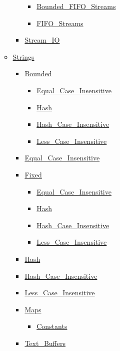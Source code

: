 \begin{multicols*}{\columnnr}
\begin{scriptsize}
\begin{itemize}[leftmargin=0mm]
\begin{itemize}[leftmargin=5mm]
\begin{itemize}[leftmargin=5mm]
\begin{itemize}[leftmargin=5mm]
	  \item[] \href{\adarmlink{RM-13-13-1.html}}{Bounded\_FIFO\_Streams}
	  \item[] \href{\adarmlink{RM-13-13-1.html}}{FIFO\_Streams}
	  \end{itemize}
	\item[] \href{\adarmlink{RM-A-12-1.html}}{Stream\_IO}
	\end{itemize}
  \item[] \href{\adarmlink{RM-A-4-1.html}}{Strings}
	\begin{itemize}[leftmargin=5mm]
	\item[] \href{\adarmlink{RM-A-4-4.html}}{Bounded}
	  \begin{itemize}[leftmargin=5mm]
	  \item[] \href{\adarmlink{RM-A-4-10.html}}{Equal\_Case\_Insensitive}
	  \item[] \href{\adarmlink{RM-A-4-9.html}}{Hash}
	  \item[] \href{\adarmlink{RM-A-4-9.html}}{Hash\_Case\_Insensitive}
	  \item[] \href{\adarmlink{RM-A-4-10.html}}{Less\_Case\_Insensitive}
	  \end{itemize}
	\item[] \href{\adarmlink{RM-A-4-10.html}}{Equal\_Case\_Insensitive}
	\item[] \href{\adarmlink{RM-A-4-3.html}}{Fixed}
	  \begin{itemize}[leftmargin=5mm]
	  \item[] \href{\adarmlink{RM-A-4-10.html}}{Equal\_Case\_Insensitive}
	  \item[] \href{\adarmlink{RM-A-4-9.html}}{Hash}
	  \item[] \href{\adarmlink{RM-A-4-9.html}}{Hash\_Case\_Insensitive}
	  \item[] \href{\adarmlink{RM-A-4-10.html}}{Less\_Case\_Insensitive}
	  \end{itemize}
	\item[] \href{\adarmlink{RM-A-4-9.html}}{Hash}
	\item[] \href{\adarmlink{RM-A-4-9.html}}{Hash\_Case\_Insensitive}
	\item[] \href{\adarmlink{RM-A-4-10.html}}{Less\_Case\_Insensitive}
	\item[] \href{\adarmlink{RM-A-4-2.html}}{Maps}
	  \begin{itemize}[leftmargin=5mm]
	  \item[] \href{\adarmlink{RM-A-4-6.html}}{Constants}
	  \end{itemize}
	\item[] \href{\adarmlink{RM-A-4-12.html}}{Text\_Buffers}

\end{itemize}
\end{itemize}
\end{itemize}
\end{scriptsize}
\end{multicols*}
